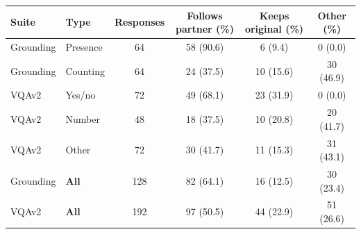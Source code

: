 \begin{tabular}{llcccc}
\toprule
Suite & Type & Responses & Follows partner (\%) & Keeps original (\%) & Other (\%) \\
\midrule
Grounding & Presence & 64 & 58 (90.6) & 6 (9.4) & 0 (0.0) \\
Grounding & Counting & 64 & 24 (37.5) & 10 (15.6) & 30 (46.9) \\
VQAv2 & Yes/no & 72 & 49 (68.1) & 23 (31.9) & 0 (0.0) \\
VQAv2 & Number & 48 & 18 (37.5) & 10 (20.8) & 20 (41.7) \\
VQAv2 & Other & 72 & 30 (41.7) & 11 (15.3) & 31 (43.1) \\
Grounding & \textbf{All} & 128 & 82 (64.1) & 16 (12.5) & 30 (23.4) \\
VQAv2 & \textbf{All} & 192 & 97 (50.5) & 44 (22.9) & 51 (26.6) \\
\bottomrule
\end{tabular}